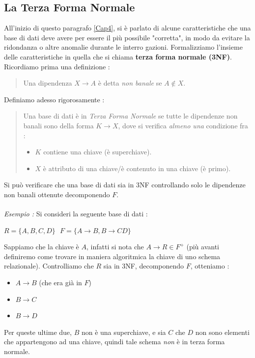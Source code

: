 \documentclass[12pt, letterpaper]{article}
\begin{document}
\subsection{La Terza Forma Normale}
All'inizio di questo paragrafo \ref{Cap4}, si è parlato di alcune caratteristiche che una base di dati deve avere per essere 
il più possibile "corretta", in modo da evitare la ridondanza o altre anomalie durante le interro gazioni. Formalizziamo 
l'insieme delle caratteristiche in quella che si chiama \textbf{terza forma normale (3NF)}. Ricordiamo prima una definizione :
\begin{quote}
    Una dipendenza \(X\rightarrow A\) è detta \textit{non banale} se \(A\notin X\).
\end{quote} 
Definiamo adesso rigorosamente : \begin{quote}
    Una base di dati è in \textit{Terza Forma Normale} se tutte le dipendenze non banali sono
     della forma \(K\rightarrow X\), dove si verifica \textit{almeno una} condizione fra :\begin{itemize}
        \item \(K\) contiene una chiave (è superchiave).
        \item \(X\) è attributo di una chiave/è contenuto in una chiave (è primo).
    \end{itemize}
\end{quote}
Si può verificare che una base di dati sia in 3NF controllando solo le dipendenze non banali ottenute decomponendo \(F\).
\\\hphantom{}\\\textit{Esempio : } Si consideri la seguente base di dati :\begin{center}
    \(R=\{A,B,C,D\}\text{ }F=\{A\rightarrow B, B\rightarrow CD\}\)
\end{center}
Sappiamo che la chiave è \(A\), infatti si nota che \(A\rightarrow R \in F^+\) (più avanti definiremo come trovare in maniera 
algoritmica la chiave di uno schema relazionale).
Controlliamo che \(R\) sia in 3NF, decomponendo \(F\), otteniamo :\begin{itemize}
    \item \(A\rightarrow B\) (che era già in \(F\))
    \item \(B\rightarrow C\)
    \item \(B\rightarrow D\)
\end{itemize}
Per queste ultime due, \(B\) non è una superchiave, e sia \(C\) che \(D\) non sono elementi che appartengono ad una chiave, 
quindi tale schema \textit{non} è in terza forma normale.
\end{document}
